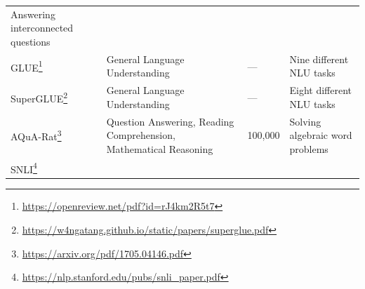 \documentclass[]{krantz}
\renewcommand{\href}[2]{#2\footnote{\url{#1}}}
\begin{document}
\begin{longtable}[]{@{}llll@{}}
\begin{minipage}[t]{0.23\columnwidth}
Answering interconnected questions\strut
\end{minipage}\tabularnewline
\begin{minipage}[t]{0.31\columnwidth}\raggedright
\href{https://openreview.net/pdf?id=rJ4km2R5t7}{GLUE}\strut
\end{minipage} & \begin{minipage}[t]{0.24\columnwidth}\raggedright
General Language Understanding\strut
\end{minipage} & \begin{minipage}[t]{0.10\columnwidth}\raggedright
---\strut
\end{minipage} & \begin{minipage}[t]{0.23\columnwidth}\raggedright
Nine different NLU tasks\strut
\end{minipage}\tabularnewline
\begin{minipage}[t]{0.31\columnwidth}\raggedright
\href{https://w4ngatang.github.io/static/papers/superglue.pdf}{SuperGLUE}\strut
\end{minipage} & \begin{minipage}[t]{0.24\columnwidth}\raggedright
General Language Understanding\strut
\end{minipage} & \begin{minipage}[t]{0.10\columnwidth}\raggedright
---\strut
\end{minipage} & \begin{minipage}[t]{0.23\columnwidth}\raggedright
Eight different NLU tasks\strut
\end{minipage}\tabularnewline
\begin{minipage}[t]{0.31\columnwidth}\raggedright
\href{https://arxiv.org/pdf/1705.04146.pdf}{AQuA-Rat}\strut
\end{minipage} & \begin{minipage}[t]{0.24\columnwidth}\raggedright
Question Answering, Reading Comprehension, Mathematical Reasoning\strut
\end{minipage} & \begin{minipage}[t]{0.10\columnwidth}\raggedright
100,000\strut
\end{minipage} & \begin{minipage}[t]{0.23\columnwidth}\raggedright
Solving algebraic word problems\strut
\end{minipage}\tabularnewline
\begin{minipage}[t]{0.31\columnwidth}\raggedright
\href{https://nlp.stanford.edu/pubs/snli_paper.pdf}{SNLI}\strut
\end{minipage} & \begin{minipage}[t]{0.24\columnwidth}\raggedright

\end{minipage}
\end{longtable}
\end{document}
